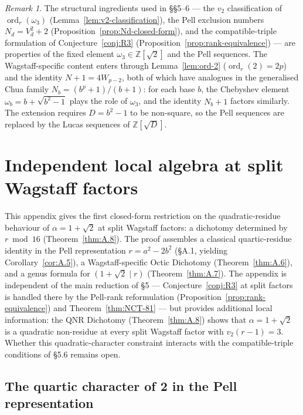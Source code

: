 \documentclass[12pt]{article}
\theoremstyle{plain}
\theoremstyle{definition}
\theoremstyle{remark}
\newtheorem{remark}[theorem]{Remark}
\begin{document}
\begin{remark}\label{rem:generalization}
The structural ingredients used in \S\S5--6 --- the
\(v_2\) classification of \(\operatorname{ord}_r(\omega_3)\)
(Lemma~\ref{lem:v2-classification}), the Pell exclusion numbers \(N_d = V_d^2+2\) (Proposition~\ref{prop:Nd-closed-form}), and the compatible-triple formulation of Conjecture~\ref{conj:R3}
(Proposition~\ref{prop:rank-equivalence}) --- are properties of the fixed element
\(\omega_3 \in \mathbb{Z}[\sqrt{2}]\) and the Pell sequences. The
Wagstaff-specific content enters through Lemma~\ref{lem:ord-2}
(\(\operatorname{ord}_r(2) = 2p\)) and the identity
\(N+1 = 4W_{p-2}\), both of which have analogues in the
generalised Chua family \(N_b = (b^p+1)/(b+1)\): for each base
\(b\), the Chebyshev element \(\omega_b = b + \sqrt{b^2-1}\) plays
the role of \(\omega_3\), and the identity \(N_b + 1\) factors
similarly. The extension requires \(D = b^2 - 1\) to be non-square,
so the Pell sequences are replaced by the Lucas sequences of
\(\mathbb{Z}[\sqrt{D}]\).
\end{remark}



\appendix
\section{Independent local algebra at split Wagstaff factors}


This appendix gives the first closed-form restriction on the
quadratic-residue behaviour of \(\alpha = 1+\sqrt 2\) at split
Wagstaff factors: a dichotomy determined by \(r \bmod 16\)
(Theorem~\ref{thm:A.8}). The proof assembles a classical quartic-residue
identity in the Pell representation \(r = a^2 - 2b^2\) (\S A.1,
yielding Corollary~\ref{cor:A.5}), a Wagstaff-specific Octic Dichotomy
(Theorem~\ref{thm:A.6}), and a genus formula for
\((1+\sqrt 2 \mid r)\) (Theorem~\ref{thm:A.7}). The appendix is
independent of the main reduction of \S5 --- Conjecture~\ref{conj:R3} at split factors
is handled there by the Pell-rank reformulation
(Proposition~\ref{prop:rank-equivalence}) and Theorem~\ref{thm:NCT-81} --- but provides
additional local information: the QNR
Dichotomy (Theorem~\ref{thm:A.8}) shows that \(\alpha = 1+\sqrt{2}\)
is a quadratic non-residue at every split Wagstaff factor with
\(v_2(r-1) = 3\). Whether this quadratic-character constraint
interacts with the compatible-triple conditions of \S5.6
remains open.

\subsection{The quartic character of 2 in the Pell representation}
\end{document}
